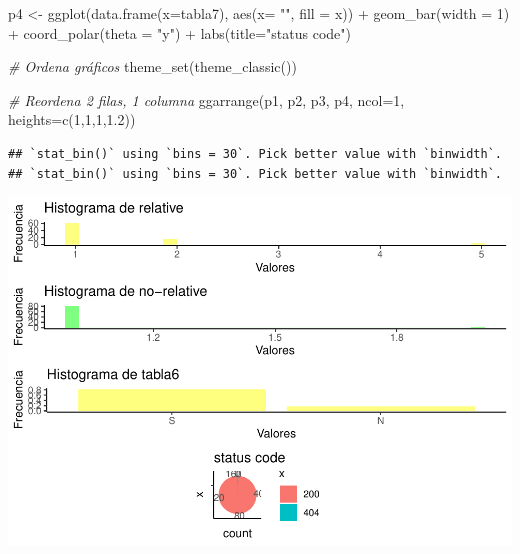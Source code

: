 \documentclass[
]{article}
\newenvironment{Shaded}{\begin{snugshade}}{\end{snugshade}}
\newcommand{\AttributeTok}[1]{\textcolor[rgb]{0.77,0.63,0.00}{#1}}
\newcommand{\CommentTok}[1]{\textcolor[rgb]{0.56,0.35,0.01}{\textit{#1}}}
\newcommand{\DecValTok}[1]{\textcolor[rgb]{0.00,0.00,0.81}{#1}}
\newcommand{\FloatTok}[1]{\textcolor[rgb]{0.00,0.00,0.81}{#1}}
\newcommand{\FunctionTok}[1]{\textcolor[rgb]{0.00,0.00,0.00}{#1}}
\newcommand{\NormalTok}[1]{#1}
\newcommand{\OtherTok}[1]{\textcolor[rgb]{0.56,0.35,0.01}{#1}}
\newcommand{\SpecialCharTok}[1]{\textcolor[rgb]{0.00,0.00,0.00}{#1}}
\newcommand{\StringTok}[1]{\textcolor[rgb]{0.31,0.60,0.02}{#1}}
\begin{document}
\begin{Shaded}
\begin{Highlighting}[]
\NormalTok{p4 }\OtherTok{\textless{}{-}} \FunctionTok{ggplot}\NormalTok{(}\FunctionTok{data.frame}\NormalTok{(}\AttributeTok{x=}\NormalTok{tabla7), }\FunctionTok{aes}\NormalTok{(}\AttributeTok{x=} \StringTok{""}\NormalTok{, }\AttributeTok{fill =}\NormalTok{ x)) }\SpecialCharTok{+} 
  \FunctionTok{geom\_bar}\NormalTok{(}\AttributeTok{width =} \DecValTok{1}\NormalTok{) }\SpecialCharTok{+} \FunctionTok{coord\_polar}\NormalTok{(}\AttributeTok{theta =} \StringTok{"y"}\NormalTok{) }\SpecialCharTok{+}
  \FunctionTok{labs}\NormalTok{(}\AttributeTok{title=}\StringTok{"status code"}\NormalTok{)}

\CommentTok{\# Ordena gráficos}
\FunctionTok{theme\_set}\NormalTok{(}\FunctionTok{theme\_classic}\NormalTok{())}

\CommentTok{\# Reordena 2 filas, 1 columna }
\FunctionTok{ggarrange}\NormalTok{(p1, p2, p3, p4, }\AttributeTok{ncol=}\DecValTok{1}\NormalTok{, }\AttributeTok{heights=}\FunctionTok{c}\NormalTok{(}\DecValTok{1}\NormalTok{,}\DecValTok{1}\NormalTok{,}\DecValTok{1}\NormalTok{,}\FloatTok{1.2}\NormalTok{))}
\end{Highlighting}
\end{Shaded}

\begin{verbatim}
## `stat_bin()` using `bins = 30`. Pick better value with `binwidth`.
## `stat_bin()` using `bins = 30`. Pick better value with `binwidth`.
\end{verbatim}

\includegraphics{Practica_2_files/figure-latex/chart_graphic-1.pdf}
\end{document}
